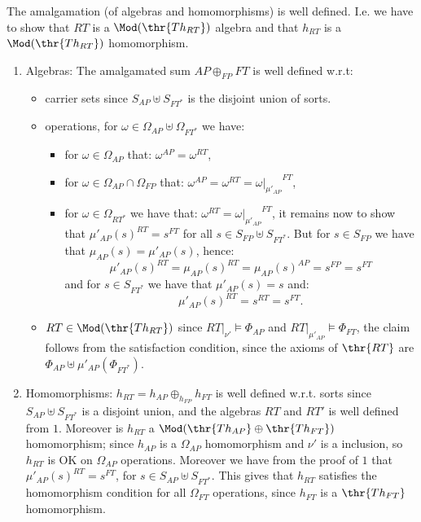 \begin{fact}
The amalgamation (of algebras and homomorphisms) is well defined. I.e. we have to show that $RT$ is a $\Mod(\thr{Th_{RT}})$ algebra and that $h_{RT}$ is a $\Mod(\thr{Th_{RT}})$ homomorphism.
\end{fact}
\begin{PROOF}
	\begin{enumerate}
	\item Algebras: The amalgamated sum $AP \oplus_{FP} FT$ is well defined w.r.t:
		\begin{itemize}
		\item carrier sets since $S_{AP} \uplus S_{FT^*}$ is the disjoint union of sorts. 
		\item operations, for $\omega \in \Omega_{AP} \uplus \Omega_{FT^*}$ we have:
			\begin{itemize}
			\item  for $\omega \in \Omega_{AP}$ that: $\omega^{AP} = \omega^{RT}$,
			\item for $\omega \in \Omega_{AP} \cap \Omega_{FP}$ that: $\omega^{AP} = \omega^{RT}={\omega|_{\mu'_{AP}}}^{FT}$,
			\item  for $\omega \in \Omega_{RT^*}$ we have that: $\omega^{RT} = {\omega|_{\mu'_{AP}}}^{FT}$, it remains now to show that $\mu'_{AP}(s)^{RT}= s^{FT}$ for all $s \in S_{FP} \uplus S_{FT^*}$. But for $s \in S_{FP}$ we have that $\mu_{AP}(s) = \mu'_{AP}(s)$, hence:
	\[ {\mu'_{AP}(s)}^{RT}= {\mu_{AP}(s)}^{RT} ={\mu_{AP}(s)}^{AP} = s^{FP}= s^{FT} \]
and for $s \in S_{FT^*}$ we have that ${\mu'_{AP}(s)} = s$ and:
	\[ {\mu'_{AP}(s)}^{RT}= s^{RT} =s^{FT}. \]
			\end{itemize}
			\item $RT \in \Mod(\thr{Th_{RT}})$ since $RT|_{\nu'} \models \Phi_{AP}$ and $RT|_{\mu'_{AP}} \models \Phi_{FT}$, the claim follows from the satisfaction condition, since the axioms of $\thr{RT}$ are $\Phi_{AP} \uplus \mu'_{AP}(\Phi_{FT^*})$.	
		\end{itemize}
	\item Homomorphisms: $h_{RT} = h_{AP} \oplus_{h_{FP}} h_{FT}$ is well defined w.r.t. sorts since $S_{AP} \uplus S_{FT^*}$ is a disjoint union, and the algebras $RT$ and $RT'$ is well defined from $1$. Moreover is $h_{RT}$ a $\Mod(\thr{Th_{AP}} \oplus \thr{Th_{FT}})$ homomorphism; since $h_{AP}$ is a $\Omega_{AP}$ homomorphism and $\nu'$ is a  inclusion, so $h_{RT}$ is OK on $\Omega_{AP}$ operations. Moreover we have from the proof of $1$ that $\mu'_{AP}(s)^{RT} = s^{FT}$, for $s \in S_{AP} \uplus S_{FT^*}$. This gives that $h_{RT}$ satisfies the homomorphism condition for all $\Omega_{FT}$ operations, since $h_{FT}$ is a $\thr{Th_{FT}}$ homomorphism.
	\end{enumerate}
\end{PROOF}



